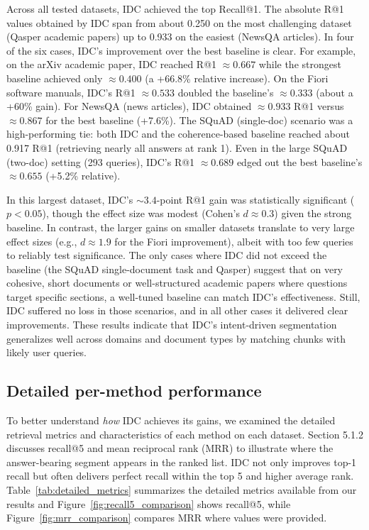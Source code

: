 \documentclass[12pt,a4paper]{report}
\begin{document}
Across all tested datasets, IDC achieved the top Recall@1. The absolute R@1 values obtained by IDC span from about 0.250 on the most challenging dataset (Qasper academic papers) up to 0.933 on the easiest (NewsQA articles). In four of the six cases, IDC's improvement over the best baseline is clear. For example, on the arXiv academic paper, IDC reached R@1 $\approx 0.667$ while the strongest baseline achieved only $\approx 0.400$ (a +66.8\% relative increase). On the Fiori software manuals, IDC's R@1 $\approx 0.533$ doubled the baseline's $\approx 0.333$ (about a +60\% gain). For NewsQA (news articles), IDC obtained $\approx 0.933$ R@1 versus $\approx 0.867$ for the best baseline (+7.6\%). The SQuAD (single-doc) scenario was a high-performing tie: both IDC and the coherence-based baseline reached about 0.917 R@1 (retrieving nearly all answers at rank 1). Even in the large SQuAD (two-doc) setting (293 queries), IDC's R@1 $\approx 0.689$ edged out the best baseline's $\approx 0.655$ (+5.2\% relative). 

In this largest dataset, IDC's $\sim3.4$-point R@1 gain was statistically significant ($p<0.05$), though the effect size was modest (Cohen's $d\approx0.3$) given the strong baseline. In contrast, the larger gains on smaller datasets translate to very large effect sizes (e.g., $d\approx1.9$ for the Fiori improvement), albeit with too few queries to reliably test significance. The only cases where IDC did not exceed the baseline (the SQuAD single-document task and Qasper) suggest that on very cohesive, short documents or well-structured academic papers where questions target specific sections, a well-tuned baseline can match IDC's effectiveness. Still, IDC suffered no loss in those scenarios, and in all other cases it delivered clear improvements. These results indicate that IDC's intent-driven segmentation generalizes well across domains and document types by matching chunks with likely user queries.

\subsection{Detailed per-method performance}\label{sec:per-method-performance}

To better understand \textit{how} IDC achieves its gains, we examined the detailed retrieval metrics and characteristics of each method on each dataset. Section 5.1.2 discusses recall@5 and mean reciprocal rank (MRR) to illustrate where the answer-bearing segment appears in the ranked list. IDC not only improves top-1 recall but often delivers perfect recall within the top 5 and higher average rank. Table~\ref{tab:detailed_metrics} summarizes the detailed metrics available from our results and Figure~\ref{fig:recall5_comparison} shows recall@5, while Figure~\ref{fig:mrr_comparison} compares MRR where values were provided.
\end{document}
